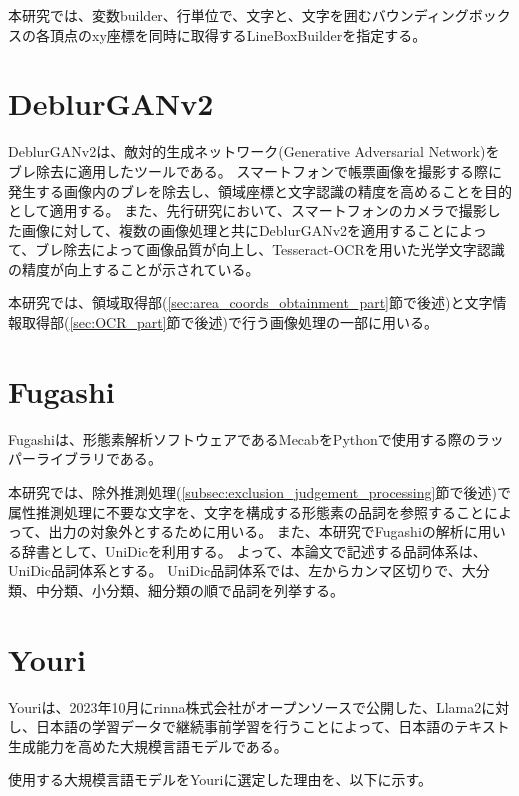 本研究では、変数builder、行単位で、文字と、文字を囲むバウンディングボックスの各頂点のxy座標を同時に取得するLineBoxBuilderを指定する。

\section{DeblurGANv2}\label{sec:DeblurGANv2}
DeblurGANv2は、敵対的生成ネットワーク(Generative Adversarial Network)をブレ除去に適用したツールである\cite{DeblurGANv2}。
スマートフォンで帳票画像を撮影する際に発生する画像内のブレを除去し、領域座標と文字認識の精度を高めることを目的として適用する。
また、先行研究において、スマートフォンのカメラで撮影した画像に対して、複数の画像処理と共にDeblurGANv2を適用することによって、ブレ除去によって画像品質が向上し、Tesseract-OCRを用いた光学文字認識の精度が向上することが示されている\cite{DeblurGANv2の先行研究}。

本研究では、領域取得部(\ref{sec:area_coords_obtainment_part}節で後述)と文字情報取得部(\ref{sec:OCR_part}節で後述)で行う画像処理の一部に用いる。

\section{Fugashi}\label{sec:Fugashi}
Fugashiは、形態素解析ソフトウェアであるMecab\cite{Mecab}をPythonで使用する際のラッパーライブラリである\cite{Fugashi}。

本研究では、除外推測処理(\ref{subsec:exclusion_judgement_processing}節で後述)で属性推測処理に不要な文字を、文字を構成する形態素の品詞を参照することによって、出力の対象外とするために用いる。
また、本研究でFugashiの解析に用いる辞書として、UniDic\cite{UniDic}を利用する。
よって、本論文で記述する品詞体系は、UniDic品詞体系とする。
UniDic品詞体系では、左からカンマ区切りで、大分類、中分類、小分類、細分類の順で品詞を列挙する\cite{UniDic品詞体系}。

\section{Youri}\label{sec:Youri}
Youriは、2023年10月にrinna株式会社\cite{rinna}がオープンソースで公開した、Llama2\cite{Llama2}に対し、日本語の学習データで継続事前学習を行うことによって、日本語のテキスト生成能力を高めた大規模言語モデルである\cite{Youri}。

使用する大規模言語モデルをYouriに選定した理由を、以下に示す。

